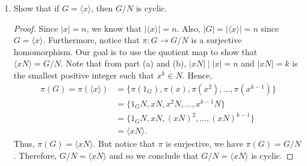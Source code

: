 \documentclass{article}
\begin{document}
\begin{problem}
\begin{enumerate}
\begin{proof}
            \end{proof}
        \item[(c)] Show that if \( G  =  \langle x   \rangle  \), then \( G / N  \) is cyclic.
            \begin{proof}
                Since \( | x  |  = n  \), we know that \( | \langle x   \rangle | = n  \). Also, \( | G  |  = | \langle x   \rangle | = n   \) since \(  G = \langle  x \rangle \). Furthermore, notice that \( \pi : G \to G / N  \) is a surjective homomorphism. Our goal is to use the quotient map to show that \( \langle  x N  \rangle = G / N  \). Note that from part (a) and (b), \( | x N  |  \mid  | x  | = n  \) and \( | x N  |  = k  \) is the smallest positive integer such that \( x^{k} \in N  \). Hence,  
                \begin{align*}
                    \pi(G) = \pi(\langle x \rangle) 
                           &= \{  \pi({1}_{G}), \pi(x), \pi(x^{2}), \dots, \pi(x^{k-1}) \} \\
                           &= \{ {1}_{G}N , xN , x^{2}N , \dots, x^{k-1} N  \} \\ 
                           &=  \{ {1}_{G}N , xN , (xN)^{2}, \dots, (xN)^{k-1} \} \\
                           &= \langle  xN \rangle.
                \end{align*}
                Thus, \( \pi(G) = \langle  xN \rangle \). But notice that \( \pi  \) is surjective, we have \( \pi(G) = G / N  \). Therefore, \( G / N = \langle  xN \rangle \) and so we conclude that \( G / N = \langle   xN \rangle \) is cyclic.  
            \end{proof}
    \end{enumerate}
\end{problem}
\end{document}
